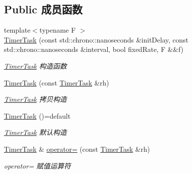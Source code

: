 \subsection*{Public 成员函数}
\begin{DoxyCompactItemize}
\item 
{\footnotesize template$<$typename F $>$ }\\\hyperlink{structTimerTask_ab87d7c5c62a8a079031b39eea3958c65}{Timer\+Task} (const std\+::chrono\+::nanoseconds \&init\+Delay, const std\+::chrono\+::nanoseconds \&interval, bool fixed\+Rate, F \&\&f)
\begin{DoxyCompactList}\small\item\em \hyperlink{structTimerTask}{Timer\+Task} 构造函数 \end{DoxyCompactList}\item 
\hyperlink{structTimerTask_a1b24917388958b16efb2d4d42593e96e}{Timer\+Task} (const \hyperlink{structTimerTask}{Timer\+Task} \&rh)
\begin{DoxyCompactList}\small\item\em \hyperlink{structTimerTask}{Timer\+Task} 拷贝构造 \end{DoxyCompactList}\item 
\mbox{\label{structTimerTask_a028f1f4221afe88383ac3c17b4c1ea41}} 
\hyperlink{structTimerTask_a028f1f4221afe88383ac3c17b4c1ea41}{Timer\+Task} ()=default
\begin{DoxyCompactList}\small\item\em \hyperlink{structTimerTask}{Timer\+Task} 默认构造 \end{DoxyCompactList}\item 
\hyperlink{structTimerTask}{Timer\+Task} \& \hyperlink{structTimerTask_a3dfbb5770a1e3496f4e34d0795565c79}{operator=} (const \hyperlink{structTimerTask}{Timer\+Task} \&rh)
\begin{DoxyCompactList}\small\item\em operator= 赋值运算符 \end{DoxyCompactList}\end{DoxyCompactItemize}
